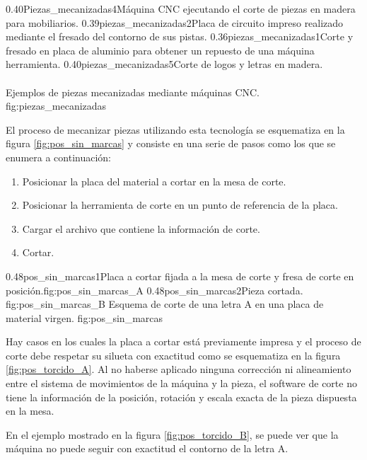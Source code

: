 \subfigtwotwo 
         {0.40}{Piezas_mecanizadas4}{Máquina CNC ejecutando el corte de piezas en madera para mobiliarios.} 
         {0.39}{piezas_mecanizadas2}{Placa de circuito impreso realizado mediante el fresado del contorno de sus pistas.}
         {0.36}{piezas_mecanizadas1}{Corte y fresado en placa de aluminio para obtener un repuesto de una máquina herramienta.}
         {0.40}{piezas_mecanizadas5}{Corte de logos y letras en madera. \\ \vphantom{10}\\ \vphantom{10}}
         {Ejemplos de piezas mecanizadas mediante máquinas CNC.}
         {fig:piezas_mecanizadas}

         El proceso de mecanizar piezas utilizando esta tecnología se esquematiza en la figura \ref{fig:pos_sin_marcas} y consiste en una serie de pasos como los que se enumera a continuación:

\begin{enumerate}
   \item{Posicionar la placa del material a cortar en la mesa de corte.}
   \item{Posicionar la herramienta de corte en un punto de referencia de la placa.}
   \item{Cargar el archivo que contiene la información de corte.}
   \item{Cortar.}
\end{enumerate}

\subfigab
         {0.48}{pos_sin_marcas1}{Placa a cortar fijada a la mesa de corte y fresa de corte en posición.}{fig:pos_sin_marcas_A}
         {0.48}{pos_sin_marcas2}{Pieza cortada.\\ \hphantom{1}}{fig:pos_sin_marcas_B}
         {Esquema de corte de una letra A en una placa de material virgen.}
         {fig:pos_sin_marcas}

         Hay casos en los cuales la placa a cortar está previamente impresa y el proceso de corte debe respetar su silueta con exactitud como se esquematiza en la figura \ref{fig:pos_torcido_A}.
         Al no haberse aplicado ninguna corrección ni alineamiento entre el sistema de movimientos de la máquina y la pieza, el software de corte no tiene la información de la posición, rotación y escala exacta de la pieza dispuesta en la mesa. \par
         En el ejemplo mostrado en la figura \ref{fig:pos_torcido_B}, se puede ver que la máquina no puede seguir con exactitud el contorno de la letra A.\\

